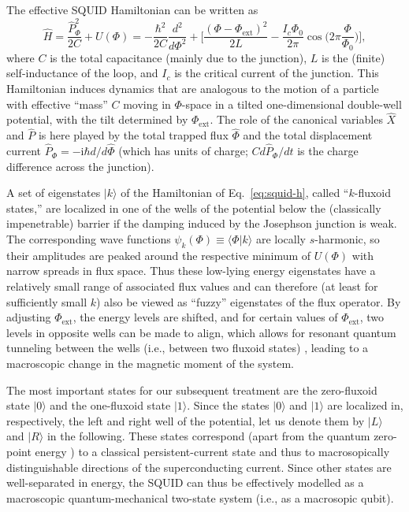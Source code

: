 \documentclass[12pt,aps,floatfix,amsmath,amssymb,showpacs,nofootinbib]{revtex4-2}
\newcommand{\ket}[1]{\ensuremath{|{#1\rangle}}}
\newcommand{\braket}[2]{\ensuremath{{\langle #1}|{#2 \rangle}}}
\begin{document}
The effective SQUID Hamiltonian can be written as \cite{Weiss:1999:tv}
%
\begin{equation} \label{eq:squid-h}
\widehat{H} = \frac{\widehat{P}_\Phi^2}{2C} + U(\Phi) 
= - \frac{\hbar^2}{2C}
 \frac{d^2}{d\Phi^2} + \biggl[ \frac{(\Phi- 
  \Phi_\text{ext})^2}{2L} - \frac{I_c \Phi_0}{2\pi} \cos \biggl(
2\pi \frac{\Phi}{\Phi_0} \biggr) \biggr],
\end{equation}
%
where $C$ is the total capacitance (mainly due to the junction), $L$
is the (finite) self-inductance of the loop, and $I_c$ is the critical
current of the junction. This Hamiltonian induces dynamics that are
analogous to the motion of a particle with effective ``mass'' $C$
moving in $\Phi$-space in a tilted one-dimensional double-well
potential, with the tilt determined by $\Phi_\text{ext}$. The role of
the canonical variables $\widehat{X}$ and $\widehat{P}$ is here played
by the total trapped flux $\widehat{\Phi}$ and the total displacement
current $\widehat{P}_\Phi = -\mathrm{i}\hbar d/d\widehat{\Phi}$ (which has
units of charge; $Cd\widehat{P}_\Phi / dt$ is the charge difference
across the junction).

A set of eigenstates $\ket{k}$ of the Hamiltonian of
Eq.~\eqref{eq:squid-h}, called ``$k$-fluxoid states,'' are localized
in one of the wells of the potential below the (classically
impenetrable) barrier if the damping induced by the Josephson junction
is weak. The corresponding wave functions $\psi_k(\Phi) \equiv
\braket{\Phi}{k}$ are locally $s$-harmonic, so their amplitudes are
peaked around the respective minimum of $U(\Phi)$ with narrow spreads
in flux space. Thus these low-lying energy eigenstates have a
relatively small range of associated flux values and can therefore (at
least for sufficiently small $k$) also be viewed as ``fuzzy''
eigenstates of the flux operator. By adjusting $\Phi_\text{ext}$, the
energy levels are shifted, and for certain values of
$\Phi_\text{ext}$, two levels in opposite wells can be made to align,
which allows for resonant quantum tunneling between the wells (i.e.,
between two fluxoid states) \cite{Silvestrini:1996:ii,Rouse:1998:om},
leading to a macroscopic change in the magnetic moment of the system.

The most important states for our subsequent treatment are the
zero-fluxoid state $\ket{0}$ and the one-fluxoid state $\ket{1}$.
Since the states $\ket{0}$ and $\ket{1}$ are localized in,
respectively, the left and right well of the potential, let us denote
them by $\ket{L}$ and $\ket{R}$ in the following. These states
correspond (apart from the quantum zero-point energy
\cite{Wal:2000:om}) to a classical persistent-current state and thus
to macrosopically distinguishable directions of the superconducting
current.  Since other states are well-separated in energy, the SQUID
can thus be effectively modelled as a macroscopic quantum-mechanical
two-state system (i.e., as a macrosopic qubit).
\end{document}
